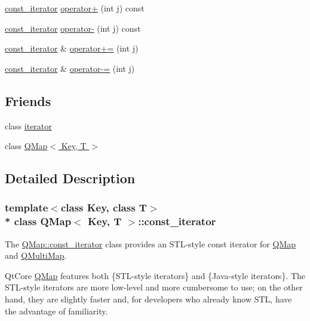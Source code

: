 \begin{DoxyCompactItemize}
\item 
\hyperlink{class_q_map_1_1const__iterator}{const\+\_\+iterator} \hyperlink{class_q_map_1_1const__iterator_a356c5b75b96b64c6b36f03a729b9d66c}{operator+} (int j) const 
\item 
\hyperlink{class_q_map_1_1const__iterator}{const\+\_\+iterator} \hyperlink{class_q_map_1_1const__iterator_afda4eb1efb318a47eac36f06062b1ad7}{operator-\/} (int j) const 
\item 
\hyperlink{class_q_map_1_1const__iterator}{const\+\_\+iterator} \& \hyperlink{class_q_map_1_1const__iterator_a4bc25c10da06380eaf1cd7dff2bae5ec}{operator+=} (int j)
\item 
\hyperlink{class_q_map_1_1const__iterator}{const\+\_\+iterator} \& \hyperlink{class_q_map_1_1const__iterator_a5a3d178472c29d0551984756dd117610}{operator-\/=} (int j)
\end{DoxyCompactItemize}
\subsection*{Friends}
\begin{DoxyCompactItemize}
\item 
class \hyperlink{class_q_map_1_1const__iterator_a67171474c4da6cc8efe0c7fafefd2b2d}{iterator}
\item 
class \hyperlink{class_q_map_1_1const__iterator_a6f07e70412dd8d995969c9e0cb5bc4a0}{Q\+Map$<$ Key, T $>$}
\end{DoxyCompactItemize}


\subsection{Detailed Description}
\subsubsection*{template$<$class Key, class T$>$\\*
class Q\+Map$<$ Key, T $>$\+::const\+\_\+iterator}

The \hyperlink{class_q_map_1_1const__iterator}{Q\+Map\+::const\+\_\+iterator} class provides an S\+T\+L-\/style const iterator for \hyperlink{class_q_map}{Q\+Map} and \hyperlink{class_q_multi_map}{Q\+Multi\+Map}. 

Qt\+Core \hyperlink{class_q_map}{Q\+Map} features both \{S\+T\+L-\/style iterators\} and \{Java-\/style iterators\}. The S\+T\+L-\/style iterators are more low-\/level and more cumbersome to use; on the other hand, they are slightly faster and, for developers who already know S\+TL, have the advantage of familiarity.

